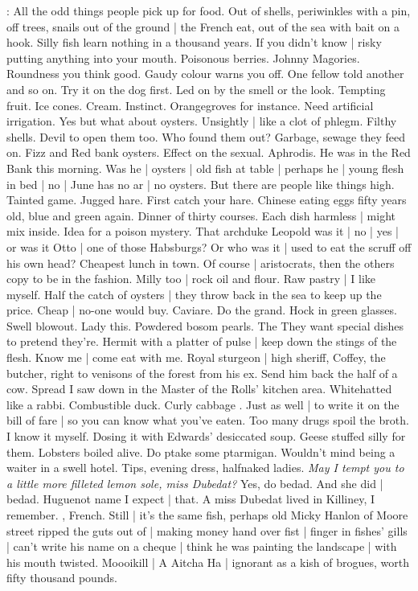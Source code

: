\BloomInt:
All the odd things people pick up for food.
Out of shells,
periwinkles with a pin,
off trees,
snails out of the ground |
the French eat,
out of the sea with bait on a hook.
Silly fish learn nothing in a thousand years.
If you didn't know |
risky putting anything into your mouth.
Poisonous berries.
Johnny Magories.
Roundness you think good.
Gaudy colour warns you off.
One fellow told another and so on.
Try it on the dog first.
Led on by the smell or the look.
Tempting fruit.
Ice cones.
Cream.
Instinct.
Orangegroves for instance.
Need artificial irrigation.
Yes but what about oysters.
Unsightly |
like a clot of phlegm.
Filthy shells.
Devil to open them too.
Who found them out?
Garbage, sewage they feed on.
Fizz and Red bank oysters.
Effect on the sexual.
Aphrodis.
He was in the Red Bank this morning.
Was he |
oysters |
old fish at table |
perhaps he |
young flesh in bed |
no |
June has no ar |
no oysters.
But there are people like things high.
Tainted game.
Jugged hare.
First catch your hare.
Chinese eating eggs fifty years old,
blue and green again.
Dinner of thirty courses.
Each dish harmless |
might mix inside.
Idea for a poison mystery.
That archduke Leopold was it |
no |
yes |
or was it Otto |
one of those Habsburgs?
Or who was it |
used to eat the scruff off his own head?
Cheapest lunch in town.
Of course |
aristocrats,
then the others copy to be in the fashion.
Milly too |
rock oil and flour.
Raw pastry |
I like myself.
Half the catch of oysters |
they throw back in the sea to keep up the price.
Cheap |
no-one would buy.
Caviare.
Do the grand.
Hock in green glasses.
Swell blowout.
Lady this.
Powdered bosom pearls.
The 
They want special dishes to pretend they're.
Hermit with a platter of pulse |
keep down the stings of the flesh.
Know me |
come eat with me.
Royal sturgeon |
high sheriff,
Coffey, the butcher,
right to venisons of the forest from his ex.
Send him back the half of a cow.
Spread I saw down in the Master of the Rolls' kitchen area.
Whitehatted  like a rabbi.
Combustible duck.
Curly cabbage .
Just as well |
to write it on the bill of fare |
so you can know what you've eaten.
Too many drugs spoil the broth.
I know it myself.
Dosing it with Edwards' desiccated soup.
Geese stuffed silly for them.
Lobsters boiled alive.
Do ptake some ptarmigan.
Wouldn't mind being a waiter in a swell hotel.
Tips,
evening dress,
halfnaked ladies.
\emph{May I tempt you to a little more filleted lemon sole,
miss Dubedat?}
Yes, do bedad.
And she did |
bedad.
Huguenot name I expect |
that.
A miss Dubedat lived in Killiney,
I remember.
, French.
Still |
it's the same fish,
perhaps old Micky Hanlon of Moore street ripped the guts out of |
making money hand over fist |
finger in fishes' gills |
can't write his name on a cheque |
think he was painting the landscape |
with his mouth twisted.
Moooikill |
A Aitcha Ha |
ignorant as a kish of brogues,
worth fifty thousand pounds.


